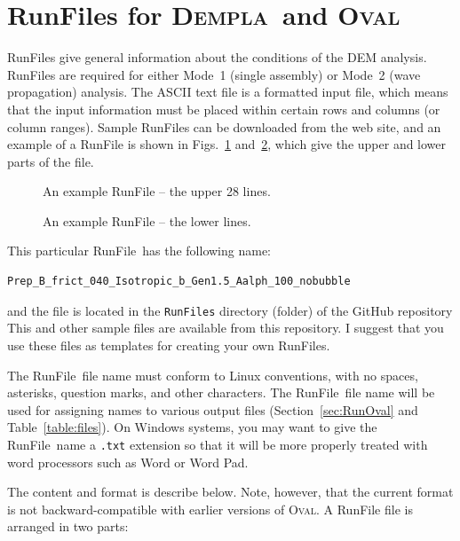 \documentclass[letterpaper,11pt]{article}
\newcommand{\Oval}{\textsc{Oval}}
\newcommand{\Dempla}{\textsc{Dempla}}
\newcommand{\RunFile}{\textsf{RunFile}}
\begin{document}
\section{\textsf{RunFile}s for \Dempla\ and \Oval}\label{sec:RunFile}
\RunFile s give general information about the conditions
of the DEM analysis.
\RunFile s are required for either Mode~1 (single assembly)
or Mode~2 (wave propagation) analysis.
The ASCII text file is a formatted input file, which means that
the input information must be placed within certain rows
and columns (or column ranges).
Sample \textsf{RunFile}s can be 
downloaded from the web site,
and an example of a \textsf{RunFile} is shown in Figs.~\ref{fig:LoadComp1}
and~\ref{fig:LoadComp2}, which give the upper and lower parts of
the file.
%
\begin{figure}
\centering\footnotesize

\caption{An example \textsf{RunFile} -- the upper 28 lines.}
\label{fig:LoadComp1}
\end{figure}
%
\begin{figure}
\centering\footnotesize

\caption{An example \textsf{RunFile} -- the lower lines.}
\label{fig:LoadComp2}
\end{figure}
%
This particular \RunFile\ has the following name:
\begin{verbatim}
Prep_B_frict_040_Isotropic_b_Gen1.5_Aalph_100_nobubble
\end{verbatim}
and the file is located in the \texttt{RunFiles} directory
(folder) of the GitHub repository
This and other sample files are available from this
repository.
I suggest that you use these files as templates for creating your
own \RunFile s.
\par
The \RunFile\ file name must conform to Linux conventions,
with no spaces, asterisks, question marks, and other characters.
The \RunFile\ file name will be used for assigning
names to various output files 
(Section~\ref{sec:RunOval} and Table~\ref{table:files}).
On Windows systems, you may want
to give the \RunFile\ name a \texttt{.txt}
extension so that it will be more properly treated with word processors
such as Word or Word Pad.
%
\par
The content and format is describe below.
Note, however, that the current format
is not backward-compatible with earlier versions of \Oval.
A \textsf{RunFile} file is arranged in two parts:
\end{document}
